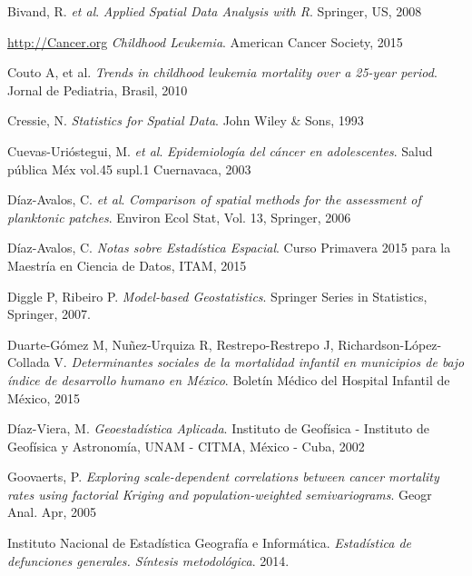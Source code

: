 \documentclass[11pt, oneside]{book}
\begin{document}


\begin{thebibliography}{9}

  Bivand, R. \emph{et al}. 
  \emph{Applied Spatial Data Analysis with R}. Springer, US, 2008

  \url{http://Cancer.org}
  \emph{Childhood Leukemia}. American Cancer Society, 2015

  Couto A, et al. 
  \emph{Trends in childhood leukemia mortality over a 25-year period}. Jornal de Pediatria, Brasil, 2010

  Cressie, N.
  \emph{Statistics for Spatial Data}. John Wiley \& Sons, 1993

  Cuevas-Urióstegui, M. \emph{et al}.
  \emph{Epidemiología del cáncer en adolescentes}. Salud pública Méx vol.45  supl.1 Cuernavaca, 2003

  Díaz-Avalos, C. \emph{et al}.
  \emph{Comparison of spatial methods for the assessment of planktonic patches}. Environ Ecol Stat, Vol. 13, Springer, 2006

  Díaz-Avalos, C.
  \emph{Notas sobre Estadística Espacial}. Curso Primavera 2015 para la Maestría en Ciencia de Datos, ITAM, 2015

  Diggle P, Ribeiro P.
  \emph{Model-based Geostatistics}. Springer Series in Statistics, Springer, 2007.

  Duarte-Gómez M, Nuñez-Urquiza R, Restrepo-Restrepo J, Richardson-López-Collada V.
  \emph{Determinantes sociales de la mortalidad infantil en municipios de bajo índice de desarrollo humano en México}. Boletín Médico del Hospital Infantil de México, 2015
  
  Díaz-Viera, M.
  \emph{Geoestadística Aplicada}. Instituto de Geofísica - Instituto de Geofísica y Astronomía, UNAM - CITMA, México - Cuba, 2002

  Goovaerts, P.
  \emph{Exploring scale-dependent correlations between cancer mortality rates using factorial Kriging and population-weighted semivariograms}. Geogr Anal. Apr, 2005

  Instituto Nacional de Estadística Geografía e Informática.
  \emph{Estadística de defunciones generales. Síntesis metodológica}. 2014.


\end{thebibliography}
\end{document}
